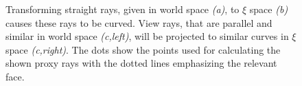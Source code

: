 \documentclass[journal]{vgtc}                %
\begin{document}
\begin{figure}[t]
    \centering
    \caption{Transforming straight rays, given in world space {\it (a)}, to $\xi$ space {\it (b)} causes these rays to be curved. View rays, that are parallel and similar in world space {\it (c,left)}, will be projected to similar curves in $\xi$ space {\it(c,right)}. The dots show the points used for calculating the shown proxy rays with the dotted lines emphasizing the relevant face.}
    \label{fig:raycoords}
\end{figure}
\end{document}

